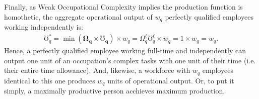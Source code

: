 \documentclass[hidelinks, nonatbib]{elsarticle}
\begin{document}
\begin{enumerate}
    Finally, as Weak Occupational Complexity implies the production function is homothetic, the aggregate operational output of $w_q$ perfectly qualified employees working independently is:
    \begin{gather}
        \mho_{q}^{*}
        =
        \min(
            \boldsymbol{\Omega_q}
            \times
            \boldsymbol{\mho_q}
        )
        \times
        w_q
        =
        \Omega_{q}^{\ell}
        \mho_{q}^{\ell}
        \times
        w_q
        =
        1
        \times
        w_q
        =
        w_q
        .
    \end{gather}
    Hence, a perfectly qualified employee working full-time and independently can output one unit of an occupation's complex tasks with one unit of their time (i.e. their entire time allowance). And, likewise, a workforce with $w_q$ employees identical to this one produces $w_q$ units of operational output. Or, to put it simply, a maximally productive person acchieves maximum production.
    

\end{enumerate}
\end{document}
